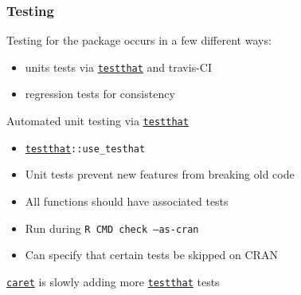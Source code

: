 \documentclass[12 pt]{beamer}\usepackage[]{graphicx}\usepackage[]{color}
\newcommand{\hlkwd}[1]{\textcolor[rgb]{0.78,0.227,0.412}{#1}}%
\newcommand{\mxkwd}[1]{\texttt{\hlkwd{#1}}}%
\newcommand{\pkg}[1]{{\fontseries{b}\selectfont #1}}
\renewcommand{\pkg}[1]{{\color{darkgreen}\texttt{#1}}}
\begin{document}
  \begin{frame}[fragile]
\frametitle{Testing}

Testing for the package occurs in a few different ways:
\begin{itemize}
\item units tests via \href{http://cran.r-project.org/web/packages/testthat/index.html}{\pkg{testthat}} and travis-CI
\item regression tests for consistency
\end{itemize}

\vspace{.2in}

Automated unit testing via \href{http://cran.r-project.org/web/packages/testthat/index.html}{\pkg{testthat}}

\begin{itemize}
\item \href{http://cran.r-project.org/web/packages/testthat/index.html}{\pkg{testthat}}{\tt ::\mxkwd{use\_testhat}}
\item Unit tests prevent new features from breaking old code
\item All functions should have associated tests
\item Run during {\tt R CMD check --as-cran}
\item Can specify that certain tests be skipped on CRAN
\end{itemize}

\href{http://cran.r-project.org/web/packages/caret/index.html}{\pkg{caret}} is slowly adding more \href{http://cran.r-project.org/web/packages/testthat/index.html}{\pkg{testthat}} tests

\end{frame}

\end{document}

